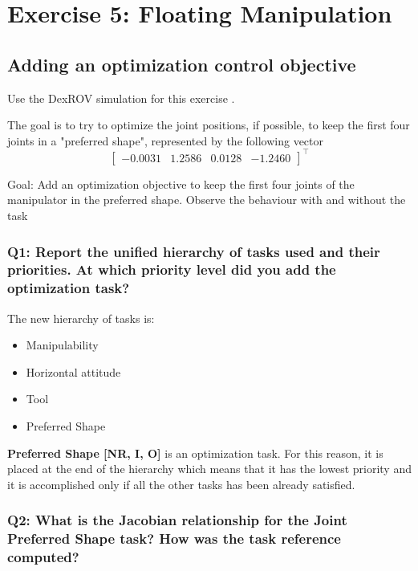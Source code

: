 \documentclass{article}
\begin{document}
\section{Exercise 5: Floating Manipulation}
\subsection{Adding an optimization control objective}
Use the DexROV simulation for this exercise .

The goal is to try to optimize the joint positions, if possible, to keep the first four joints in a "preferred shape", represented by the following vector
\begin{displaymath}
\begin{bmatrix}-0.0031 & 1.2586 & 0.0128 & -1.2460 \end{bmatrix}^\top
\end{displaymath}

Goal: Add an optimization objective to keep the first four joints of the manipulator in the preferred shape. Observe the behaviour with and without the task

\subsubsection{Q1: Report the unified hierarchy of tasks used and their priorities. At which priority level did you add the optimization task?}

The new hierarchy of tasks is:
\begin{itemize} 
	\item Manipulability
	\item Horizontal attitude
        \item Tool
        \item Preferred Shape 
\end{itemize}

\textbf{Preferred Shape [NR, I, O]} is an optimization task. For this reason, it is placed at the end of the hierarchy which means that it has the lowest priority and it is accomplished only if all the other tasks has been already satisfied. 

\subsubsection{Q2: What is the Jacobian relationship for the Joint Preferred Shape task? How was the task reference computed?}
\end{document}
